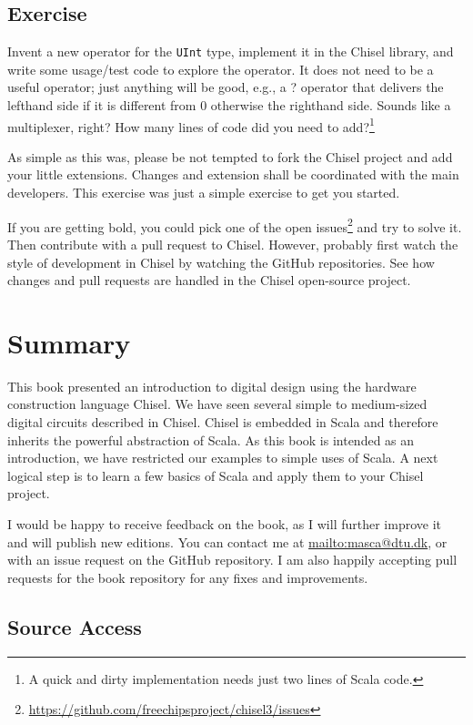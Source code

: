 \documentclass[%
    10pt,
    headinclude, footexclude,
    openright, %
    notitlepage,
    cleardoubleempty,
    headsepline,
    pointlessnumbers,
    bibtotoc, idxtotoc,
    ]{scrbook}
\newcommand{\code}[1]{{\small{\texttt{#1}}}}
\newcommand{\myref}[2]{\href{#1}{#2}}
\renewcommand{\myref}[2]{{#2}{\footnote{\url{#1}}}}
\begin{document}
\section{Exercise}

Invent a new operator for the \code{UInt} type, implement it in the Chisel library,
and write some usage/test code to explore the operator. It does not need to be
a useful operator; just anything will be good, e.g., a ? operator that delivers the lefthand side
if it is different from 0 otherwise the righthand side. Sounds like a multiplexer, right?
How many lines of code did you need to add?\footnote{A quick and dirty implementation
needs just two lines of Scala code.}

As simple as this was, please be not tempted to fork the Chisel project and
add your little extensions. Changes and extension shall be coordinated with the
main developers.
This exercise was just a simple exercise to get you started.

If you are getting bold, you could pick one of the
\myref{https://github.com/freechipsproject/chisel3/issues}{open issues} and try to solve it.
Then contribute with a pull request to Chisel.
However, probably first watch the style of development in Chisel by watching the GitHub
repositories.
See how changes and pull requests are handled in the Chisel open-source project.


\chapter{Summary}
\label{sec:conclusion}

This book presented an introduction to digital design using the
hardware construction language Chisel.
We have seen several simple to medium-sized digital circuits
described in Chisel.
Chisel is embedded in Scala and therefore inherits the powerful
abstraction of Scala.
As this book is intended as an introduction, we have restricted
our examples to simple uses of Scala.
A next logical step is to learn a few basics of Scala and apply them
to your Chisel project.

I would be happy to receive feedback on the book, as I will further
improve it and will publish new editions. You can contact me at
\url{mailto:masca@dtu.dk}, or with an issue request on the GitHub
repository. I am also happily accepting pull requests
for the book repository for any fixes and improvements.

\section*{Source Access}
\end{document}
